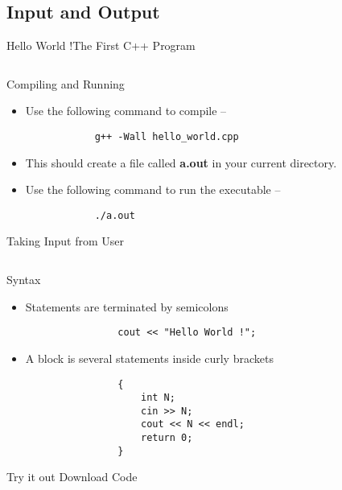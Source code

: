 \subsection{Input and Output}

\begin{frame}{Hello World !}{The First C++ Program}
  \inputminted{c++}{../code/hello_world/hello_world.cpp}
\end{frame}

\begin{frame}[fragile]{Compiling and Running}
  \begin{itemize}
      \item Use the following command to compile --
        \begin{verbatim}
            g++ -Wall hello_world.cpp
        \end{verbatim}
    \pause
      \item This should create a file called \textbf{a.out} in your current directory.
      \item Use the following command to run the executable --
        \begin{verbatim}
            ./a.out
        \end{verbatim}
  \end{itemize}
\end{frame}

\begin{frame}{Taking Input from User}{}
  \inputminted{c++}{../code/input/input.cpp}
\end{frame}

\begin{frame}[fragile]{Syntax}%
    \begin{itemize}
        \item Statements are terminated by semicolons
            \begin{verbatim}
                cout << "Hello World !";
            \end{verbatim}
        \pause
        \item A block is several statements inside curly brackets
            \begin{verbatim}
                {
                    int N;
                    cin >> N;
                    cout << N << endl;
                    return 0;
                }
            \end{verbatim}
    \end{itemize}
\end{frame}

\begin{frame}{Try it out}{}
    Download Code
\end{frame}
